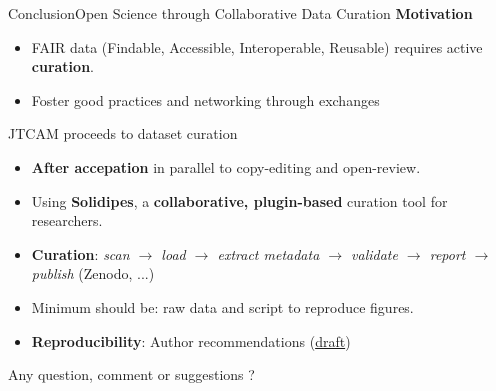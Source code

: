 \documentclass[10pt,compress,serif,aspectratio=169]{beamer}
\begin{document}
\begin{frame}[t]{Conclusion}{Open Science through Collaborative Data Curation}
	\textbf{Motivation}
	\begin{itemize}
		\item FAIR data (Findable, Accessible, Interoperable, Reusable) requires active \textbf{curation}.
		\item Foster good practices and networking through exchanges
	\end{itemize}
	\vfill
	\pause
	JTCAM proceeds to dataset curation
	\begin{itemize}
		\item \textbf{After accepation} in parallel to copy-editing and open-review.
		\item Using \textbf{Solidipes}, a \textbf{collaborative, plugin-based} curation tool for researchers.
		\item \textbf{Curation}: \textit{scan $\rightarrow$ load $\rightarrow$ extract metadata $\rightarrow$ validate $\rightarrow$ report $\rightarrow$ publish} (Zenodo, ...)
		\item Minimum should be: raw data and script to reproduce figures.
		\item \textbf{Reproducibility}: Author recommendations (\href{https://jtcam.github.io/authors-guidelines/authors_guidelines.html}{draft})
	\end{itemize}
	\pause
	\vfill
	\begin{center}
		\Large{Any question, comment or suggestions ?}
	\end{center}

\end{frame}
\end{document}
